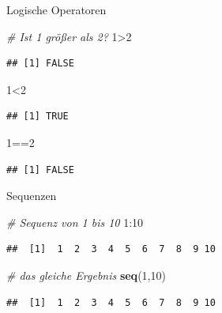 \documentclass[ignorenonframetext,]{beamer}
\newenvironment{Shaded}{}{}
\newcommand{\KeywordTok}[1]{\textcolor[rgb]{0.00,0.44,0.13}{\textbf{{#1}}}}
\newcommand{\DecValTok}[1]{\textcolor[rgb]{0.25,0.63,0.44}{{#1}}}
\newcommand{\CommentTok}[1]{\textcolor[rgb]{0.38,0.63,0.69}{\textit{{#1}}}}
\newcommand{\NormalTok}[1]{{#1}}
\begin{document}
\begin{frame}[fragile]{Logische Operatoren}

\begin{Shaded}
\begin{Highlighting}[]
\CommentTok{# Ist 1 größer als 2?}
\DecValTok{1}\NormalTok{>}\DecValTok{2}
\end{Highlighting}
\end{Shaded}

\begin{verbatim}
## [1] FALSE
\end{verbatim}

\begin{Shaded}
\begin{Highlighting}[]
\DecValTok{1}\NormalTok{<}\DecValTok{2}
\end{Highlighting}
\end{Shaded}

\begin{verbatim}
## [1] TRUE
\end{verbatim}

\begin{Shaded}
\begin{Highlighting}[]
\DecValTok{1}\NormalTok{==}\DecValTok{2}
\end{Highlighting}
\end{Shaded}

\begin{verbatim}
## [1] FALSE
\end{verbatim}

\end{frame}

\begin{frame}[fragile]{Sequenzen}

\begin{Shaded}
\begin{Highlighting}[]
\CommentTok{# Sequenz von 1 bis 10}
\DecValTok{1}\NormalTok{:}\DecValTok{10}
\end{Highlighting}
\end{Shaded}

\begin{verbatim}
##  [1]  1  2  3  4  5  6  7  8  9 10
\end{verbatim}

\begin{Shaded}
\begin{Highlighting}[]
\CommentTok{# das gleiche Ergebnis}
\KeywordTok{seq}\NormalTok{(}\DecValTok{1}\NormalTok{,}\DecValTok{10}\NormalTok{)}
\end{Highlighting}
\end{Shaded}

\begin{verbatim}
##  [1]  1  2  3  4  5  6  7  8  9 10
\end{verbatim}

\end{frame}
\end{document}
